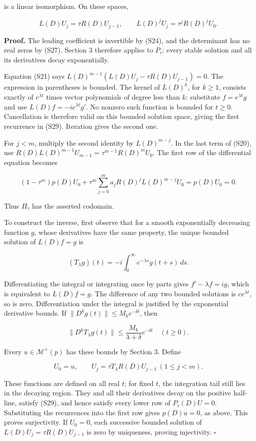 \documentclass[
  11pt,
]{article}
\begin{document}
is a linear isomorphism. On these spaces,

\[
L(D)U_j=\tau R(D)U_{j-1},\qquad
L(D)^jU_j=\tau^jR(D)^jU_0.                               \tag{S29}
\]

\textbf{Proof.} The leading coefficient is invertible by (S24), and the
determinant has no real zeros by (S27). Section 3 therefore applies to
\(P_\tau\): every stable solution and all its derivatives decay
exponentially.

Equation (S21) says \(L(D)^{m-1}(L(D)U_j-\tau R(D)U_{j-1})=0\). The
expression in parentheses is bounded. The kernel of \(L(D)^k\), for
\(k\geq1\), consists exactly of \(e^{\lambda t}\) times vector
polynomials of degree less than \(k\): substitute \(f=e^{\lambda t}g\)
and use \(L(D)f=-ie^{\lambda t}g'\). No nonzero such function is bounded
for \(t\geq0\). Cancellation is therefore valid on this bounded solution
space, giving the first recurrence in (S29). Iteration gives the second
one.

For \(j<m\), multiply the second identity by \(L(D)^{m-j}\). In the last
term of (S20), use \(R(D)L(D)^{m-1}U_{m-1}=\tau^{m-1}R(D)^mU_0\). The
first row of the differential equation becomes

\[
(1-\tau^m)p(D)U_0+
\tau^m\sum_{j=0}^ma_jR(D)^jL(D)^{m-j}U_0=p(D)U_0=0.
\]

Thus \(\Pi_\tau\) has the asserted codomain.

To construct the inverse, first observe that for a smooth exponentially
decreasing function \(g\), whose derivatives have the same property, the
unique bounded solution of \(L(D)f=g\) is

\[
(T_\lambda g)(t)
=-i\int_0^\infty e^{-\lambda s}g(t+s)\,ds.                \tag{S30}
\]

Differentiating the integral or integrating once by parts gives
\(f'-\lambda f=ig\), which is equivalent to \(L(D)f=g\). The difference
of any two bounded solutions is \(ce^{\lambda t}\), so is zero.
Differentiation under the integral is justified by the exponential
derivative bounds. If \(\|D^kg(t)\|\leq M_ke^{-\delta t}\), then

\[
\|D^kT_\lambda g(t)\|\leq
\frac{M_k}{\lambda+\delta}e^{-\delta t}
\quad(t\geq0).                                          \tag{S31}
\]

Every \(u\in\mathcal M^+(p)\) has these bounds by Section 3. Define

\[
U_0=u,\qquad U_j=\tau T_\lambda R(D)U_{j-1}\ (1\leq j<m). \tag{S32}
\]

These functions are defined on all real \(t\); for fixed \(t\), the
integration tail still lies in the decaying region. They and all their
derivatives decay on the positive half-line, satisfy (S29), and hence
satisfy every lower row of \(P_\tau(D)U=0\). Substituting the
recurrences into the first row gives \(p(D)u=0\), as above. This proves
surjectivity. If \(U_0=0\), each successive bounded solution of
\(L(D)U_j=\tau R(D)U_{j-1}\) is zero by uniqueness, proving injectivity.
\(\square\)
\end{document}
